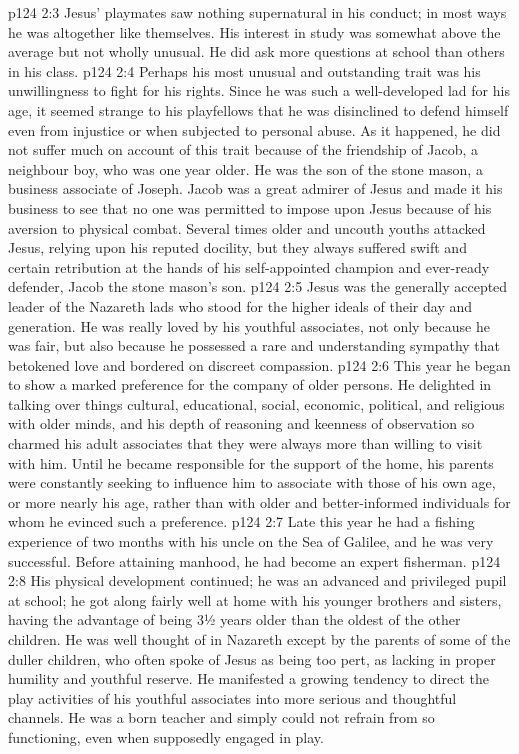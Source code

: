 \vs p124 2:3 Jesus’ playmates saw nothing supernatural in his conduct; in most ways he was altogether like themselves. His interest in study was somewhat above the average but not wholly unusual. He did ask more questions at school than others in his class.
\vs p124 2:4 \pc Perhaps his most unusual and outstanding trait was his unwillingness to fight for his rights. Since he was such a well\hyp{}developed lad for his age, it seemed strange to his playfellows that he was disinclined to defend himself even from injustice or when subjected to personal abuse. As it happened, he did not suffer much on account of this trait because of the friendship of Jacob, a neighbour boy, who was one year older. He was the son of the stone mason, a business associate of Joseph. Jacob was a great admirer of Jesus and made it his business to see that no one was permitted to impose upon Jesus because of his aversion to physical combat. Several times older and uncouth youths attacked Jesus, relying upon his reputed docility, but they always suffered swift and certain retribution at the hands of his self\hyp{}appointed champion and ever\hyp{}ready defender, Jacob the stone mason’s son.
\vs p124 2:5 Jesus was the generally accepted leader of the Nazareth lads who stood for the higher ideals of their day and generation. He was really loved by his youthful associates, not only because he was fair, but also because he possessed a rare and understanding sympathy that betokened love and bordered on discreet compassion.
\vs p124 2:6 This year he began to show a marked preference for the company of older persons. He delighted in talking over things cultural, educational, social, economic, political, and religious with older minds, and his depth of reasoning and keenness of observation so charmed his adult associates that they were always more than willing to visit with him. Until he became responsible for the support of the home, his parents were constantly seeking to influence him to associate with those of his own age, or more nearly his age, rather than with older and better\hyp{}informed individuals for whom he evinced such a preference.
\vs p124 2:7 Late this year he had a fishing experience of two months with his uncle on the Sea of Galilee, and he was very successful. Before attaining manhood, he had become an expert fisherman.
\vs p124 2:8 His physical development continued; he was an advanced and privileged pupil at school; he got along fairly well at home with his younger brothers and sisters, having the advantage of being 3½ years older than the oldest of the other children. He was well thought of in Nazareth except by the parents of some of the duller children, who often spoke of Jesus as being too pert, as lacking in proper humility and youthful reserve. He manifested a growing tendency to direct the play activities of his youthful associates into more serious and thoughtful channels. He was a born teacher and simply could not refrain from so functioning, even when supposedly engaged in play.
